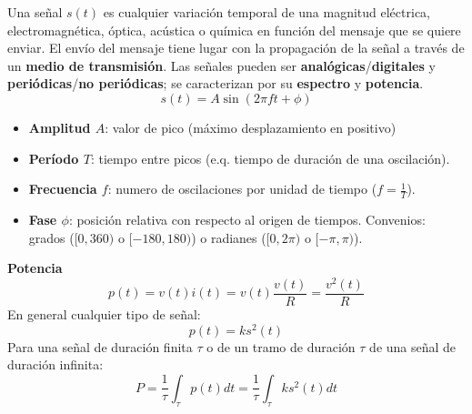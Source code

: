 \documentclass[10pt,a4paper]{article}
\begin{document}
\begin{tcolorbox}[title=Señal]
    Una señal $s(t)$ es cualquier variación temporal de una magnitud eléctrica, electromagnética, óptica, acústica o química en función del mensaje que se quiere enviar.
    El envío del mensaje tiene lugar con la propagación de la señal a través de un \textbf{medio de transmisión}.
    Las señales pueden ser \textbf{analógicas}/\textbf{digitales} y \textbf{periódicas}/\textbf{no periódicas}; se caracterizan por su \textbf{espectro} y \textbf{potencia}.
    \[
        s(t) = A \sin(2\pi f t + \phi)
    \]
    \begin{itemize}
        \item \textbf{Amplitud $A$}: valor de pico (máximo desplazamiento en positivo)
        \item \textbf{Período $T$}: tiempo entre picos (e.q. tiempo de duración de una oscilación).
        \item \textbf{Frecuencia $f$}: numero de oscilaciones por unidad de tiempo ($f = \frac{1}{T}$).
        \item \textbf{Fase $\phi$}: posición relativa con respecto al origen de tiempos. Convenios: grados ($[0, 360)$ o $[-180, 180)$) o radianes ($[0, 2\pi)$ o $[-\pi, \pi)$).
    \end{itemize}
    \textbf{Potencia}
    \[
        p(t) = v(t)i(t) = v(t)\frac{v(t)}{R} = \frac{v^2(t)}{R}
    \]
    En general cualquier tipo de señal:
    \[
        p(t) = ks^2(t)
    \]
    Para una señal de duración finita $\tau$ o de un tramo de duración $\tau$ de una señal de duración infinita:
    \[
        P = \frac{1}{\tau}\int_\tau{p(t)dt} = \frac{1}{\tau}\int_\tau{ks^2(t)dt}
    \]
\end{tcolorbox}
\end{document}
